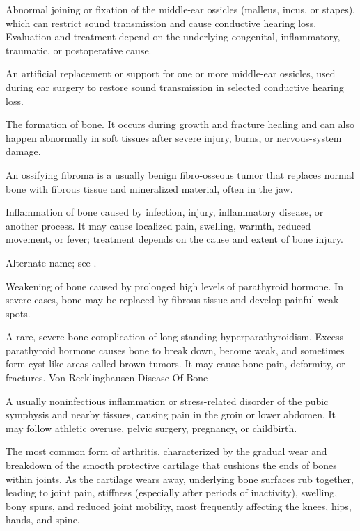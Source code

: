  Abnormal joining or fixation of the middle-ear ossicles (malleus, incus, or stapes), which can restrict sound transmission and cause conductive hearing loss. Evaluation and treatment depend on the underlying congenital, inflammatory, traumatic, or postoperative cause.

 An artificial replacement or support for one or more middle-ear ossicles, used during ear surgery to restore sound transmission in selected conductive hearing loss.

 The formation of bone. It occurs during growth and fracture healing and can also happen abnormally in soft tissues after severe injury, burns, or nervous-system damage.

 An ossifying fibroma is a usually benign fibro-osseous tumor that replaces normal bone with fibrous tissue and mineralized material, often in the jaw.

 Inflammation of bone caused by infection, injury, inflammatory disease, or another process. It may cause localized pain, swelling, warmth, reduced movement, or fever; treatment depends on the cause and extent of bone injury.

 Alternate name; see .

 Weakening of bone caused by prolonged high levels of parathyroid hormone. In severe cases, bone may be replaced by fibrous tissue and develop painful weak spots.

 A rare, severe bone complication of long-standing hyperparathyroidism. Excess parathyroid hormone causes bone to break down, become weak, and sometimes form cyst-like areas called brown tumors. It may cause bone pain, deformity, or fractures.
\synonyms
Von Recklinghausen Disease Of Bone

 A usually noninfectious inflammation or stress-related disorder of the pubic symphysis and nearby tissues, causing pain in the groin or lower abdomen. It may follow athletic overuse, pelvic surgery, pregnancy, or childbirth.

 The most common form of arthritis, characterized by the gradual wear and breakdown of the smooth protective cartilage that cushions the ends of bones within joints. As the cartilage wears away, underlying bone surfaces rub together, leading to joint pain, stiffness (especially after periods of inactivity), swelling, bony spurs, and reduced joint mobility, most frequently affecting the knees, hips, hands, and spine.

